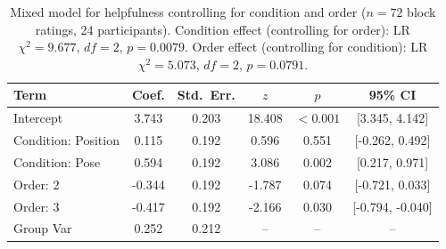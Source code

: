 \begin{table}[htbp]
\centering
\caption{Mixed model for helpfulness controlling for condition and order ($n = 72$ block ratings, 24 participants). Condition effect (controlling for order): LR $\chi^2 = 9.677$, $df = 2$, $p = 0.0079$. Order effect (controlling for condition): LR $\chi^2 = 5.073$, $df = 2$, $p = 0.0791$.}
\label{tab:mixedmodel-helpfulness}
\begin{tabular}{lccccc}
\toprule
Term & Coef. & Std.\ Err. & $z$ & $p$ & 95\% CI \\
\midrule
Intercept                & 3.743  & 0.203 & 18.408 & $<0.001$ & [3.345, 4.142] \\
Condition: Position      & 0.115  & 0.192 & 0.596  & 0.551    & [-0.262, 0.492] \\
Condition: Pose          & 0.594  & 0.192 & 3.086  & 0.002    & [0.217, 0.971] \\
Order: 2                 & -0.344 & 0.192 & -1.787 & 0.074    & [-0.721, 0.033] \\
Order: 3                 & -0.417 & 0.192 & -2.166 & 0.030    & [-0.794, -0.040] \\
\midrule
Group Var                & 0.252  & 0.212 & --     & --       & -- \\
\bottomrule
\end{tabular}
\end{table}
